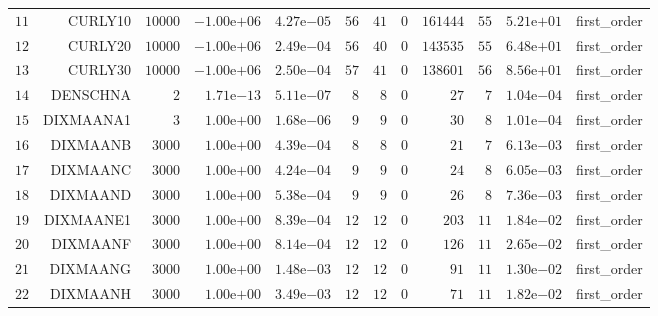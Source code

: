 \begin{longtable}{rrrrrrrrrrrr}
  \(    11\) & CURLY10 & \( 10000\) & \(-1.00\)e\(+06\) & \( 4.27\)e\(-05\) & \(    56\) & \(    41\) & \(     0\) & \(161444\) & \(    55\) & \( 5.21\)e\(+01\) & first\_order \\
  \(    12\) & CURLY20 & \( 10000\) & \(-1.00\)e\(+06\) & \( 2.49\)e\(-04\) & \(    56\) & \(    40\) & \(     0\) & \(143535\) & \(    55\) & \( 6.48\)e\(+01\) & first\_order \\
  \(    13\) & CURLY30 & \( 10000\) & \(-1.00\)e\(+06\) & \( 2.50\)e\(-04\) & \(    57\) & \(    41\) & \(     0\) & \(138601\) & \(    56\) & \( 8.56\)e\(+01\) & first\_order \\
  \(    14\) & DENSCHNA & \(     2\) & \( 1.71\)e\(-13\) & \( 5.11\)e\(-07\) & \(     8\) & \(     8\) & \(     0\) & \(    27\) & \(     7\) & \( 1.04\)e\(-04\) & first\_order \\
  \(    15\) & DIXMAANA1 & \(     3\) & \( 1.00\)e\(+00\) & \( 1.68\)e\(-06\) & \(     9\) & \(     9\) & \(     0\) & \(    30\) & \(     8\) & \( 1.01\)e\(-04\) & first\_order \\
  \(    16\) & DIXMAANB & \(  3000\) & \( 1.00\)e\(+00\) & \( 4.39\)e\(-04\) & \(     8\) & \(     8\) & \(     0\) & \(    21\) & \(     7\) & \( 6.13\)e\(-03\) & first\_order \\
  \(    17\) & DIXMAANC & \(  3000\) & \( 1.00\)e\(+00\) & \( 4.24\)e\(-04\) & \(     9\) & \(     9\) & \(     0\) & \(    24\) & \(     8\) & \( 6.05\)e\(-03\) & first\_order \\
  \(    18\) & DIXMAAND & \(  3000\) & \( 1.00\)e\(+00\) & \( 5.38\)e\(-04\) & \(     9\) & \(     9\) & \(     0\) & \(    26\) & \(     8\) & \( 7.36\)e\(-03\) & first\_order \\
  \(    19\) & DIXMAANE1 & \(  3000\) & \( 1.00\)e\(+00\) & \( 8.39\)e\(-04\) & \(    12\) & \(    12\) & \(     0\) & \(   203\) & \(    11\) & \( 1.84\)e\(-02\) & first\_order \\
  \(    20\) & DIXMAANF & \(  3000\) & \( 1.00\)e\(+00\) & \( 8.14\)e\(-04\) & \(    12\) & \(    12\) & \(     0\) & \(   126\) & \(    11\) & \( 2.65\)e\(-02\) & first\_order \\
  \(    21\) & DIXMAANG & \(  3000\) & \( 1.00\)e\(+00\) & \( 1.48\)e\(-03\) & \(    12\) & \(    12\) & \(     0\) & \(    91\) & \(    11\) & \( 1.30\)e\(-02\) & first\_order \\
  \(    22\) & DIXMAANH & \(  3000\) & \( 1.00\)e\(+00\) & \( 3.49\)e\(-03\) & \(    12\) & \(    12\) & \(     0\) & \(    71\) & \(    11\) & \( 1.82\)e\(-02\) & first\_order \\

\end{longtable}
